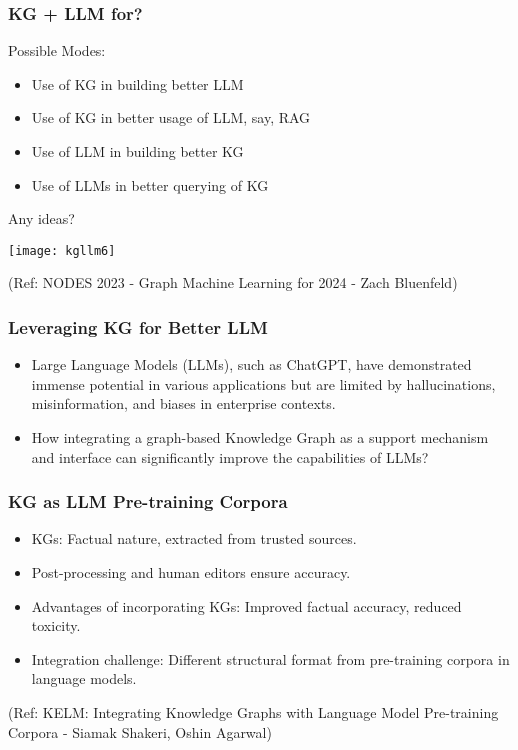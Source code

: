 \begin{frame}[fragile]\frametitle{KG + LLM for?}

Possible Modes:
\begin{itemize}
\item Use of KG in building better LLM
\item Use of KG in better usage of LLM, say, RAG
\item Use of LLM in building better KG
\item Use of LLMs in better querying of KG
\end{itemize}
	
Any ideas?

\begin{center}
\texttt{[image: kgllm6]}
\end{center}	

{\tiny (Ref: NODES 2023 - Graph Machine Learning for 2024 - Zach Bluenfeld)}


\end{frame}

\begin{frame}[fragile]\frametitle{Leveraging KG for Better LLM}

\begin{itemize}
\item Large Language Models (LLMs), such as ChatGPT, have demonstrated immense potential in various applications but are limited by hallucinations, misinformation, and biases in enterprise contexts.
\item How integrating a graph-based Knowledge Graph as a support mechanism and interface can significantly improve the capabilities of LLMs?
\end{itemize}	

\end{frame}




\begin{frame}[fragile]\frametitle{KG as LLM Pre-training Corpora}

\begin{itemize}
\item KGs: Factual nature, extracted from trusted sources.
\item Post-processing and human editors ensure accuracy.
\item Advantages of incorporating KGs: Improved factual accuracy, reduced toxicity.
\item Integration challenge: Different structural format from pre-training corpora in language models.
\end{itemize}	

{\tiny (Ref: KELM: Integrating Knowledge Graphs with Language Model Pre-training Corpora - Siamak Shakeri, Oshin Agarwal)}
\end{frame}


